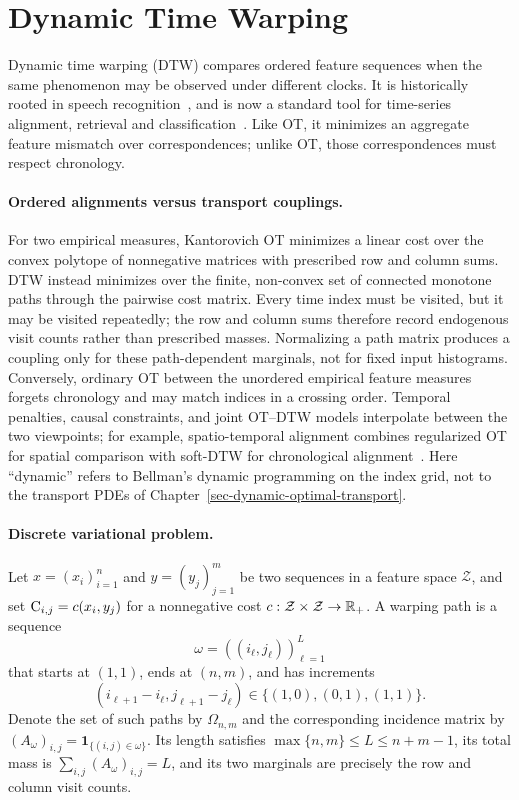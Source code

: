 \section{Dynamic Time Warping}\label{sec-dynamic-time-warping}

Dynamic time warping (DTW) compares ordered feature sequences when the same phenomenon may be observed under different clocks. It is historically rooted in speech recognition~\cite{Vintsyuk1968DTW,SakoeChiba1978DTW}, and is now a standard tool for time-series alignment, retrieval and classification~\cite{BerndtClifford1994DTW,Muller2007MusicMotion}. Like OT, it minimizes an aggregate feature mismatch over correspondences; unlike OT, those correspondences must respect chronology.

\paragraph{Ordered alignments versus transport couplings.}
For two empirical measures, Kantorovich OT minimizes a linear cost over the convex polytope of nonnegative matrices with prescribed row and column sums. DTW instead minimizes over the finite, non-convex set of connected monotone paths through the pairwise cost matrix. Every time index must be visited, but it may be visited repeatedly; the row and column sums therefore record endogenous visit counts rather than prescribed masses. Normalizing a path matrix produces a coupling only for these path-dependent marginals, not for fixed input histograms. Conversely, ordinary OT between the unordered empirical feature measures forgets chronology and may match indices in a crossing order. Temporal penalties, causal constraints, and joint OT--DTW models interpolate between the two viewpoints; for example, spatio-temporal alignment combines regularized OT for spatial comparison with soft-DTW for chronological alignment~\cite{JanatiCuturiGramfort2020STA}. Here ``dynamic'' refers to Bellman's dynamic programming on the index grid, not to the transport PDEs of Chapter~\ref{sec-dynamic-optimal-transport}.

\paragraph{Discrete variational problem.}
Let $x=(x_i)_{i=1}^n$ and $y=(y_j)_{j=1}^m$ be two sequences in a feature space $\mathcal Z$, and set $\mathrm{C}_{i,j}=c(x_i,y_j)$ for a nonnegative cost $c:\mathcal Z\times\mathcal Z\to\mathbb{R}_+$. A warping path is a sequence
\[
	\omega=((i_\ell,j_\ell))_{\ell=1}^L
\]
that starts at $(1,1)$, ends at $(n,m)$, and has increments
\[
	(i_{\ell+1}-i_\ell,j_{\ell+1}-j_\ell)
	\in\{(1,0),(0,1),(1,1)\}.
\]
Denote the set of such paths by $\Omega_{n,m}$ and the corresponding incidence matrix by $(A_\omega)_{i,j}=\mathbf 1_{\{(i,j)\in\omega\}}$. Its length satisfies $\max\{n,m\}\leq L\leq n+m-1$, its total mass is $\sum_{i,j}(A_\omega)_{i,j}=L$, and its two marginals are precisely the row and column visit counts.

